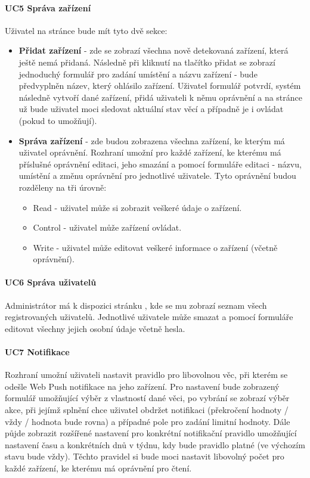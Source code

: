 \paragraph{UC5 Správa zařízení}
\label{UC5}
Uživatel na stránce  bude mít tyto dvě sekce:
\begin{itemize}
    \item \textbf{Přidat zařízení} - zde se zobrazí všechna nově detekovaná zařízení, která ještě nemá přidaná. Následně při kliknutí na tlačítko přidat se zobrazí jednoduchý formulář pro zadání umístění a názvu zařízení - bude předvyplněn název, který ohlásilo zařízení. Uživatel formulář potvrdí, systém následně vytvoří dané zařízení, přidá uživateli k němu oprávnění a na stránce  už bude uživatel moci sledovat aktuální stav věcí a případně je i ovládat (pokud to umožňují).
    \item  \textbf{Správa zařízení} - zde budou zobrazena všechna zařízení, ke kterým má uživatel oprávnění. Rozhraní umožní pro každé zařízení, ke kterému má příslušné oprávnění editaci, jeho smazání a pomocí formuláře editaci - názvu, umístění a změnu oprávnění pro jednotlivé uživatele. Tyto oprávnění budou rozděleny na tři úrovně:
          \begin{itemize}
              \item Read - uživatel může si zobrazit veškeré údaje o zařízení.
              \item Control - uživatel může zařízení ovládat.
              \item Write - uživatel může editovat veškeré informace o zařízení (včetně oprávnění).
          \end{itemize}
\end{itemize}

\paragraph{UC6 Správa uživatelů}
Administrátor má k dispozici stránku , kde se mu zobrazí seznam všech registrovaných uživatelů. Jednotlivé uživatele může smazat a pomocí formuláře editovat všechny jejich osobní údaje včetně hesla.

\paragraph{UC7 Notifikace}
Rozhraní umožní uživateli nastavit pravidlo pro libovolnou věc, při kterém se odešle Web Push notifikace na jeho zařízení. Pro nastavení bude zobrazený formulář umožňující výběr z vlastností dané věci, po vybrání se zobrazí výběr akce, při jejímž splnění chce uživatel obdržet notifikaci (překročení hodnoty / vždy / hodnota bude rovna) a případné pole pro zadání limitní hodnoty. Dále půjde zobrazit rozšířené nastavení pro konkrétní notifikační pravidlo umožňující nastavení času a konkrétních dnů v týdnu, kdy bude pravidlo platné (ve výchozím stavu bude vždy). Těchto pravidel si bude moci nastavit libovolný počet pro každé zařízení, ke kterému má oprávnění pro čtení.



